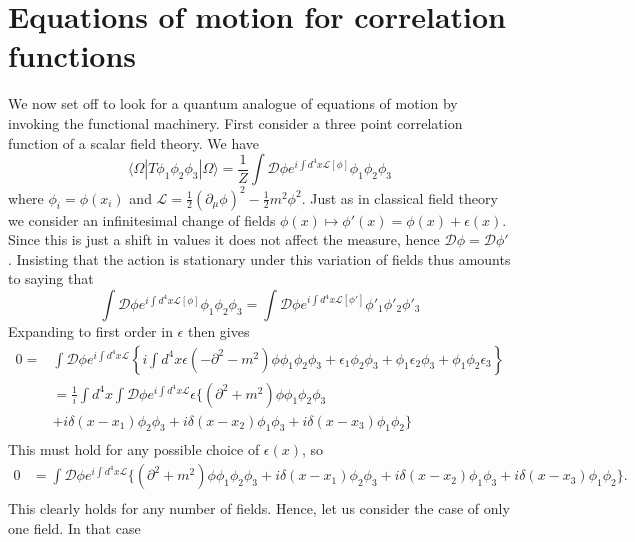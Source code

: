 \documentclass[twoside,utf8]{article}
\newcommand{\ket}[1] { |#1\rangle }
\newcommand{\bra}[1] { \langle #1 | }
\begin{document}
\section{Equations of motion for correlation functions}
We now set off to look for a quantum analogue of equations of motion by invoking the functional machinery. First consider a three point correlation function of a scalar field theory. We have
\[
\bra{\Omega} T\phi_1\phi_2\phi_3\ket{\Omega}
=
\frac{1}{Z}\int \mathcal{D}\phi e^{i\int d^4x\mathcal{L}[\phi]} \phi_1 \phi_2 \phi_3
\]
where $\phi_i = \phi(x_i)$ and $\mathcal{L}=\frac{1}{2}(\partial_\mu \phi)^2-\frac{1}{2}m^2 \phi^2$. Just as in classical field theory we consider an infinitesimal change of fields $\phi(x)\mapsto \phi'(x)=\phi(x)+\epsilon(x)$. Since this is just a shift in values it does not affect the measure, hence $\mathcal{D}\phi = \mathcal{D}\phi'$. Insisting that the action is stationary under this variation of fields thus amounts to saying that
\[
\int \mathcal{D}\phi e^{i\int d^4x\mathcal{L}[\phi]} \phi_1 \phi_2 \phi_3
=
\int \mathcal{D}\phi e^{i\int d^4x\mathcal{L}[\phi']} \phi'_1 \phi'_2 \phi'_3
\]
Expanding to first order in $\epsilon$ then gives
\begin{equation*}
	\begin{align}
	0
	=&
	\int \mathcal{D}\phi e^{i\int d^4x\mathcal{L}} \left\{
	i\int d^4x \epsilon\left(-\partial^2-m^2\right)\phi \phi_1 \phi_2 \phi_3
	+\epsilon_1 \phi_2 \phi_3
	+\phi_1 \epsilon_2 \phi_3
	+\phi_1 \phi_2 \epsilon_3
	\right\} \\
	&=
	\frac{1}{i}\int d^4x\int \mathcal{D}\phi e^{i\int d^4x\mathcal{L}}  \epsilon \big\{
	\left(\partial^2+m^2\right)\phi \phi_1 \phi_2 \phi_3 \\
 &+i\delta(x-x_1) \phi_2 \phi_3
	+i\delta(x-x_2) \phi_1 \phi_3
	+i\delta(x-x_3) \phi_1 \phi_2
	\big\} \\
	\end{align}
\end{equation*}
This must hold for any possible choice of $\epsilon(x)$, so
\begin{equation*}
	\begin{align}
	0
	&=
	\int \mathcal{D}\phi e^{i\int d^4x\mathcal{L}} \big\{
	\left(\partial^2+m^2\right)\phi \phi_1 \phi_2 \phi_3
  +i\delta(x-x_1) \phi_2 \phi_3
	+i\delta(x-x_2) \phi_1 \phi_3
	+i\delta(x-x_3) \phi_1 \phi_2
	\big\}. \\
	\end{align}
\end{equation*}
This clearly holds for any number of fields. Hence, let us consider the case of only one field. In that case
\end{document}
